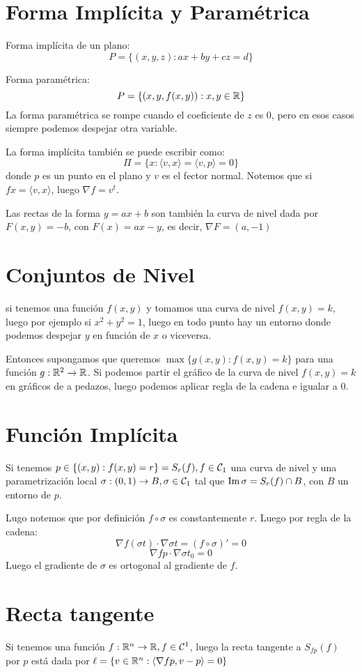 \documentclass{article}
\begin{document}
\section*{Forma Implícita y Paramétrica}
Forma implícita de un plano:
\[
	P = \{(x,y,z) : ax + by + cz = d\}
\]

Forma paramétrica:
\[
	P = \{(x, y, f(x,y)) : x,y \in \mathbb{R}\}
\]
La forma paramétrica se rompe cuando el coeficiente de $z$ es $0$, pero en esos casos siempre podemos despejar otra variable.

La forma implícita también se puede escribir como:
\[\Pi = \{x : \langle v, x \rangle = \langle v, p \rangle = 0\}\]
donde $p$ es un punto en el plano y $v$ es el fector normal.
Notemos que si $fx = \langle v, x \rangle$, luego $\nabla f = v^t$.

Las rectas de la forma $y = ax + b$ son también la curva de nivel dada por $F(x, y) = -b$, con $F(x) = ax - y$, es decir, $\nabla F = (a, -1)$

\section*{Conjuntos de Nivel}
si tenemos una función $f(x,y)$ y tomamos una curva de nivel $f(x,y) = k$, luego por ejemplo si $x^2+y^2 = 1$, luego en todo punto hay un entorno donde podemos despejar $y$ en función de $x$ o viceversa.

Entonces supongamos que queremos $\max \{g(x,y) : f(x,y) = k\}$ para una función $g : \mathbb{R}^2 \to \mathbb{R}$. Si podemos partir el gráfico de la curva de nivel $f(x,y) = k$ en gráficos de a pedazos, luego podemos aplicar regla de la cadena e igualar a $0$.

\section*{Función Implícita}
Si tenemos $p \in \{(x,y) : f(x,y) = r\} = S_r(f), f \in \mathcal{C}_1$ una curva de nivel y una parametrización local $\sigma : (0,1) \to B, \sigma \in \mathcal{C}_1$ tal que $\operatorname{Im} \sigma = S_r(f) \cap B$, con $B$ un entorno de $p$.

Lugo notemos que por definición $f \circ \sigma$ es constantemente $r$.
Luego por regla de la cadena:
\[
	\nabla f (\sigma t) \cdot \nabla \sigma t = (f \circ \sigma)' = 0
\]
\[
	\nabla f p \cdot \nabla \sigma t_0 = 0
\]
Luego el gradiente de $\sigma$ es ortogonal al gradiente de $f$.

\section*{Recta tangente}
Si tenemos una función $f : \mathbb{R}^n \to \mathbb{R}, f \in \mathcal{C}^1$, luego la recta tangente a $S_{fp}(f)$ por $p$ está dada por $\ell = \{v \in \mathbb{R}^n : \langle\nabla fp, v-p \rangle = 0\}$
\end{document}
